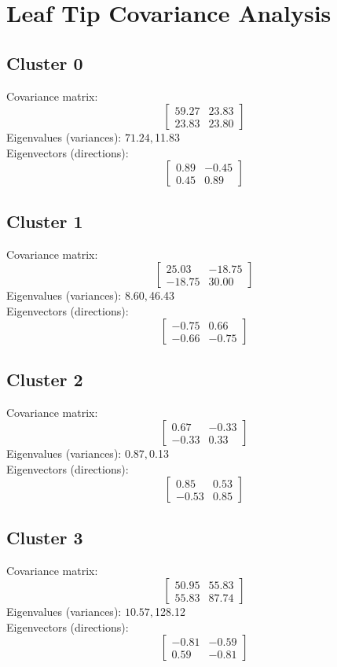 \documentclass{article}
\begin{document}
\section*{Leaf Tip Covariance Analysis}
\subsection*{Cluster 0}
Covariance matrix:
\[\begin{bmatrix}59.27 & 23.83 \\23.83 & 23.80\end{bmatrix}\]
Eigenvalues (variances): $ 71.24, $11.83\\
Eigenvectors (directions):
\[\begin{bmatrix}0.89 & -0.45 \\0.45 & 0.89\end{bmatrix}\]
\subsection*{Cluster 1}
Covariance matrix:
\[\begin{bmatrix}25.03 & -18.75 \\-18.75 & 30.00\end{bmatrix}\]
Eigenvalues (variances): $ 8.60, $46.43\\
Eigenvectors (directions):
\[\begin{bmatrix}-0.75 & 0.66 \\-0.66 & -0.75\end{bmatrix}\]
\subsection*{Cluster 2}
Covariance matrix:
\[\begin{bmatrix}0.67 & -0.33 \\-0.33 & 0.33\end{bmatrix}\]
Eigenvalues (variances): $ 0.87, $0.13\\
Eigenvectors (directions):
\[\begin{bmatrix}0.85 & 0.53 \\-0.53 & 0.85\end{bmatrix}\]
\subsection*{Cluster 3}
Covariance matrix:
\[\begin{bmatrix}50.95 & 55.83 \\55.83 & 87.74\end{bmatrix}\]
Eigenvalues (variances): $ 10.57, $128.12\\
Eigenvectors (directions):
\[\begin{bmatrix}-0.81 & -0.59 \\0.59 & -0.81\end{bmatrix}\]
\end{document}
